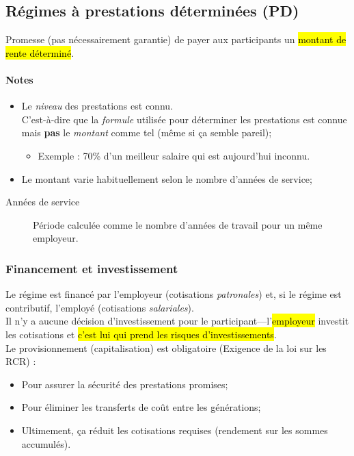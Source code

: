 \documentclass[10pt, french]{article}
\begin{document}
\begin{multicols*}{3}
\columnbreak

\subsection{Régimes à prestations déterminées (PD)}

\begin{definitionNOHFILL}[Description]
Promesse (pas nécessairement garantie) de payer aux participants un \hl{montant de rente déterminé}.

\paragraph{Notes}
\begin{itemize}[leftmargin = *]
	\item	Le \textit{niveau} des prestations est connu.\\
			C'est-à-dire que la \textit{formule} utilisée pour déterminer les prestations est connue mais \textbf{pas} le \textit{montant} comme tel (même si ça semble pareil);
		\begin{itemize}
		\item	 Exemple : 70\% d'un meilleur salaire qui est aujourd'hui inconnu.
		\end{itemize}
	\item	Le montant varie habituellement selon le nombre d'années de service;
\end{itemize}
\begin{description}
	\item[Années de service]	Période calculée comme le nombre d'années de travail pour un même employeur.
\end{description}
\end{definitionNOHFILL}

\subsubsection*{Financement et investissement}

Le régime est financé par l'employeur (cotisations \textit{patronales}) et, si le régime est contributif, l'employé (cotisations \textit{salariales}).\\

Il n'y a aucune décision d'investissement pour le participant---l'\hl{employeur} investit les cotisations et \hl{c'est lui qui prend les risques d'investissements}. \\

Le provisionnement (capitalisation) est obligatoire (Exigence de la loi sur les RCR) : 
\begin{itemize}
	\item Pour assurer la sécurité des prestations promises;
	\item Pour éliminer les transferts de coût entre les générations;
	\item Ultimement, ça réduit les cotisations requises (rendement sur les sommes accumulés).
\end{itemize}


\end{multicols*}
\end{document}
